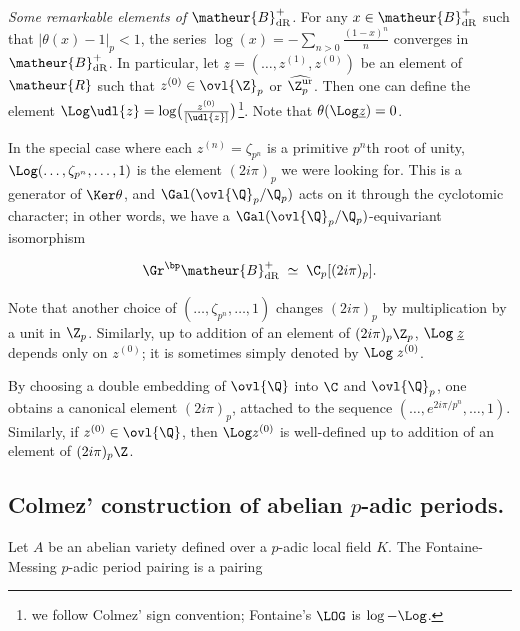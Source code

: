 \begin{para}
 {\itshape Some remarkable elements of $\matheur{B}^+_{\mathrm{dR}}$.}
 For any $x \in \matheur{B}^+_{\mathrm{dR}}$ such that $|\theta(x)-1|_p< 1$,
 the series $\log(x) = - \sum_{n>0} \frac{(1-x)^n}{n}$ converges in
 $\matheur{B}^+_{\mathrm{dR}}$.  In particular, let $\underline {z} =
 (\ldots,z^{(1)},z^{(0)})$ be an element of $\matheur{R}$ such that $z^{(0)}\in
 {\ovl{\Z}}_p$ or $\widehat{{\Z}_p^{\mathrm{ur}}}$.  Then one can define the
 element 
 $\Log \udl{z} = \log
 \bigl(\frac{z^{(0)}}{[\udl{z}]}\bigr)$\footnote{we follow Colmez' sign 
 convention; Fontaine's $\LOG$ is $\log - \Log$.%
 }.
 Note that $\theta(\Log \underline{z})=0$. 

 In the special case where each
 $z^{(n)}=\zeta_{p^n}$ is a primitive $p^n$th root of unity,
 $\Log(\ldots, \zeta_{p^n}, \ldots,1)$ is the element $(2i\pi)_p$ 
 we were looking for. This is a generator of $\Ker \theta$, and 
 $\Gal({\ovl{\Q}}_p/{\Q}_p)$ acts on it through the cyclotomic character;
 in other words, we have a $\Gal({\ovl{\Q}}_p/{\Q}_p)$-equivariant
 isomorphism

 \begin{equation*}
 \Gr^{\bp}\matheur{B}^+_{\mathrm{dR}}\;\simeq\; {\C}_p[(2i\pi)_p].
 \end{equation*}
 
 Note that another choice of $(\ldots, \zeta_{p^n},
 \ldots,1)$ changes $(2i\pi)_p$ by multiplication by a unit in ${\Z}_p$.
 Similarly,
 up to addition of an element of $(2i\pi)_p{\Z}_p$, $\Log\;\underline
 {z}\;$ depends only on
 $z^{(0)}$; it is sometimes simply denoted by $\Log\;z^{(0)}$.

 By choosing a double embedding of ${\ovl{\Q}}$ into $\C$ and
 ${\ovl{\Q}}_p$,
 one obtains a canonical element $(2i\pi)_p$, attached to the sequence
 $(\ldots, e^{2i\pi/{p^n}},\ldots,1)$. Similarly, if $z^{(0)}\in
 {\ovl{\Q}}$, then $\Log z^{(0)}$ is 
 well-defined up to addition of an element of $(2i\pi)_p{\Z}$.
\end{para}

\subsection{Colmez' construction of abelian $p$-adic periods.}

Let $A$ be an abelian variety defined over a $p$-adic local field
$K$. The Fontaine-Messing $p$-adic period pairing is a pairing

